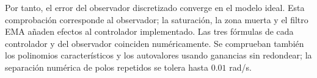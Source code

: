 \documentclass[11pt]{article}
\begin{document}
Por tanto, el error del observador discretizado converge en el modelo ideal. Esta comprobación corresponde al observador; la saturación, la zona muerta y el filtro EMA añaden efectos al controlador implementado.
Las tres fórmulas de cada controlador y del observador coinciden numéricamente. Se comprueban también los polinomios característicos y los autovalores usando ganancias sin redondear; la separación numérica de polos repetidos se tolera hasta $0.01$ rad/s.
\end{document}
